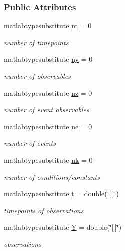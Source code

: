 \subsubsection*{Public Attributes}
\begin{DoxyCompactItemize}
\item 
matlabtypesubstitute \hyperlink{classamidata_a03cfcdd983bff4aef77268b785b28345}{nt} = 0
\begin{DoxyCompactList}\small\item\em number of timepoints \end{DoxyCompactList}\item 
matlabtypesubstitute \hyperlink{classamidata_a289ca425eb368f1d582b6be2be0d3dfc}{ny} = 0
\begin{DoxyCompactList}\small\item\em number of observables \end{DoxyCompactList}\item 
matlabtypesubstitute \hyperlink{classamidata_a79f11413e5bfe18a0e71e17574399ad5}{nz} = 0
\begin{DoxyCompactList}\small\item\em number of event observables \end{DoxyCompactList}\item 
matlabtypesubstitute \hyperlink{classamidata_aaca25d624cf863f786f67137c62aa11d}{ne} = 0
\begin{DoxyCompactList}\small\item\em number of events \end{DoxyCompactList}\item 
matlabtypesubstitute \hyperlink{classamidata_afd6bea572754e0c3c320664bdccf0200}{nk} = 0
\begin{DoxyCompactList}\small\item\em number of conditions/constants \end{DoxyCompactList}\item 
matlabtypesubstitute \hyperlink{classamidata_aaccc9105df5383111407fd5b41255e23}{t} = double(\char`\"{}\mbox{[}$\,$\mbox{]}\char`\"{})
\begin{DoxyCompactList}\small\item\em timepoints of observations \end{DoxyCompactList}\item 
matlabtypesubstitute \hyperlink{classamidata_a0867f43e27585e019c13f7f4b7c4ab6b}{Y} = double(\char`\"{}\mbox{[}$\,$\mbox{]}\char`\"{})
\begin{DoxyCompactList}\small\item\em observations \end{DoxyCompactList}\item 

\end{DoxyCompactItemize}
